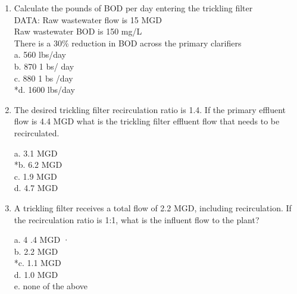 \documentclass{article}
\begin{document}
\begin{enumerate}
\item Calculate the pounds of BOD per day entering the trickling filter\\
DATA:
Raw wastewater flow is 15 MGD\\
Raw wastewater BOD is 150 mg/L\\
There is a 30\% reduction in BOD across the primary clarifiers\\
a. 560 lbs/day\\
b. 870 1 bs/ day\\
c. 880 1 bs /day\\
*d. 1600 lbs/day


\item  The desired trickling filter recirculation ratio is 1.4. If the primary effluent flow is 4.4 MGD what is the trickling filter effluent flow that needs to be recirculated. 

a. 3.1 MGD \\
*b. 6.2 MGD \\
c. 1.9 MGD \\
d. 4.7 MGD 

\item  A trickling filter receives a total flow of 2.2 MGD, including recirculation. If the recirculation ratio is 1:1, what is the influent flow to the plant? 

a. 4 .4 MGD · \\
b. 2.2 MGD \\
*c. 1.1 MGD \\
d. 1.0 MGD \\
e. none of the above







\end{enumerate}
\end{document}
